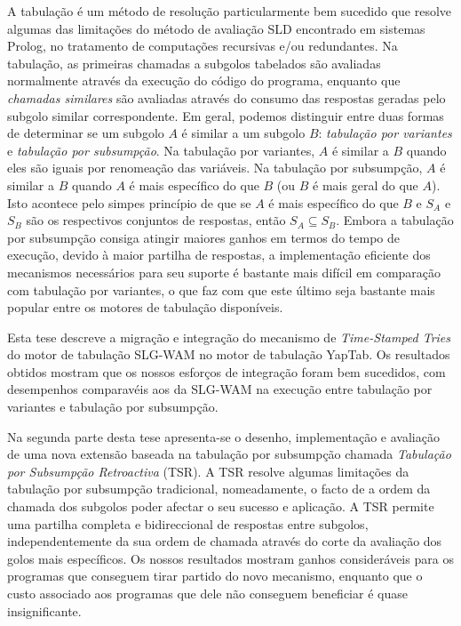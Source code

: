 A tabulação é um método de resolução particularmente bem sucedido que resolve algumas das limitações
do método de avaliação SLD encontrado em sistemas Prolog, no tratamento de computações recursivas e/ou redundantes.
Na tabulação, as primeiras chamadas a subgolos tabelados são avaliadas normalmente através da execução do código do
programa, enquanto que \emph{chamadas similares} são avaliadas através do consumo das respostas geradas
pelo subgolo similar correspondente.
Em geral, podemos distinguir entre duas formas de determinar se um subgolo $A$ é similar a um subgolo $B$:
\emph{tabulação por variantes} e \emph{tabulação por subsumpção}.
Na tabulação por variantes, $A$ é similar a $B$ quando eles são iguais por renomeação das variáveis.
Na tabulação por subsumpção, $A$ é similar a $B$ quando $A$ é mais específico do que $B$ (ou $B$ é mais geral do que $A$).
Isto acontece pelo simpes princípio de que se $A$ é mais específico do que $B$ e $S_A$ e $S_B$ são os respectivos
conjuntos de respostas, então $S_A \subseteq S_B$.
Embora a tabulação por subsumpção consiga atingir maiores ganhos em termos do tempo de execução, devido
à maior partilha de respostas, a implementação eficiente dos mecanismos necessários para seu suporte é bastante
mais difícil em comparação com tabulação por variantes, o que faz com que este último seja bastante mais popular
entre os motores de tabulação disponíveis.

Esta tese descreve a migração e integração do mecanismo de \emph{Time-Stamped Tries} do motor de tabulação
SLG-WAM no motor de tabulação YapTab. Os resultados obtidos mostram que os nossos esforços de integração foram
bem sucedidos, com desempenhos comparavéis aos da SLG-WAM na execução entre tabulação por variantes e tabulação
por subsumpção.

Na segunda parte desta tese apresenta-se o desenho, implementação e avaliação de uma nova extensão baseada na tabulação
por subsumpção chamada \emph{Tabulação por Subsumpção Retroactiva} (TSR). A TSR resolve algumas limitações da
tabulação por subsumpção tradicional, nomeadamente, o facto de a ordem da chamada dos subgolos poder afectar o seu sucesso e
aplicação. A TSR permite uma partilha completa e bidireccional de respostas entre subgolos, independentemente da
sua ordem de chamada através do corte da avaliação dos golos mais específicos.
Os nossos resultados mostram ganhos consideráveis para os programas que conseguem tirar partido do novo mecanismo,
enquanto que o custo associado aos programas que dele não conseguem beneficiar é quase insignificante.